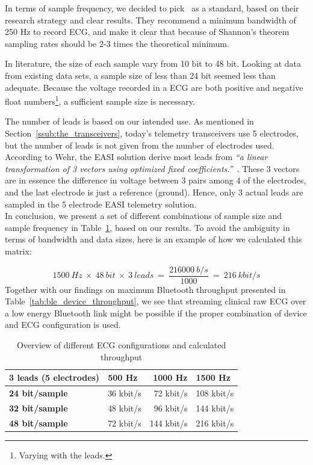 In terms of sample frequency, we decided to pick~\cite{Rijnbeek:2001vu} as a standard, based on their research strategy and clear results. They recommend a minimum bandwidth of 250 Hz to record ECG, and make it clear that because of Shannon’s theorem sampling rates should be 2-3 times the theoretical minimum.

In literature, the size of each sample vary from 10 bit to 48 bit. Looking at data from existing data sets, a sample size of less than 24 bit seemed less than adequate. Because the voltage recorded in a ECG are both positive and negative float numbers\footnote{ Varying with the leads.}, a sufficient sample size is necessary. 

The number of leads is based on our intended use. As mentioned in Section~\ref{ssub:the_transceivers}, today's telemetry transceivers use 5 electrodes, but the number of leads is not given from the number of electrodes used. According to Wehr, the EASI solution derive most leads from \textit{``a linear transformation of 3 vectors using optimized fixed coefficients.''}~\cite{Wehr:2006ht}. These 3 vectors are in essence the difference in voltage between 3 pairs among 4 of the electrodes, and the last electrode is just a reference (ground). Hence, only 3 actual leads are sampled in the 5 electrode EASI telemetry solution.
\\
\newline
\noindent
In conclusion, we present a set of different combinations of sample size and sample frequency in Table~\ref{tab:ecg_sampling_rate}, based on our results. To avoid the ambiguity in terms of bandwidth and data sizes, here is an example of how we calculated this matrix:

\[
  1500\:Hz\:\times\:48\:bit\:\times\:3\:leads\:=\:\frac{216000\:b/s}{1000}\:=\:216\:kbit/s
\]
\noindent
Together with our findings on maximum Bluetooth throughput presented in Table~\ref{tab:ble_device_throughput}, we see that streaming clinical raw ECG over a low energy Bluetooth link might be possible if the proper combination of device and ECG configuration is used.

\begin{table}[]
\centering
\caption{Overview of different ECG configurations and calculated throughput}
\label{tab:ecg_sampling_rate}
\begin{tabular}{@{}l|lrl@{}}
\toprule
\textbf{3 leads (5 electrodes)} & \textbf{500 Hz} & \textbf{1000 Hz} & \textbf{1500 Hz} \\ \midrule
\textbf{24  bit/sample}         & 36 kbit/s & 72 kbit/s & 108 kbit/s         \\
\textbf{32  bit/sample}         & 48 kbit/s & 96 kbit/s & 144 kbit/s         \\
\textbf{48  bit/sample}         & 72 kbit/s & 144 kbit/s  & 216 kbit/s         \\ \bottomrule
\end{tabular}
\end{table}



